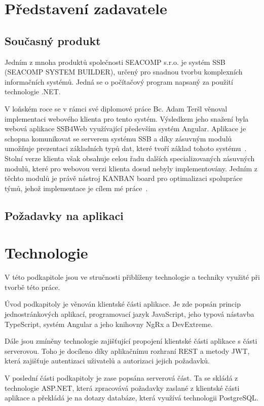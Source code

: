 \section{Představení zadavatele}
\blindtext

\subsection{Současný produkt}
Jedním z mnoha produktů společnosti SEACOMP s.r.o. je systém SSB (SEACOMP SYSTEM BUILDER), určený pro snadnou tvorbu komplexních informačních systémů. Jedná se o počítačový program napsaný za použití technologie .NET.

V loňském roce se v rámci své diplomové práce Bc. Adam Teršl věnoval implementaci webového klienta pro tento systém. Výsledkem jeho snažení byla webová aplikace SSB4Web využívající především systém Angular. Aplikace je schopna komunikovat se serverem systému SSB a díky zásuvným modulů umožňuje prezentaci základních typů dat, které tvoří základ tohoto systému~\cite{bib:tersl}. Stolní verze klienta však obsahuje celou řadu dalších specializovaných zásuvných modulů, které pro webovou verzi klienta dosud nebyly implementovány. Jedním z těchto modulů je právě nástroj KANBAN board pro optimalizaci spolupráce týmů, jehož implementace je cílem mé práce~\cite{bib:seacomp-portfolio}. 

\subsection{Požadavky na aplikaci}
\blindtext[3]

\section{Technologie}
V této podkapitole jsou ve stručnosti přiblíženy technologie a techniky využité při tvorbě této práce. 

Úvod podkapitoly je věnován klientské části aplikace. Je zde popsán princip jednostránkových aplikací, programovací jazyk JavaScript, jeho typová nástavba TypeScript, systém Angular a jeho knihovny NgRx a DevExtreme.

Dále jsou zmíněny technologie zajišťující propojení klientské části aplikace s části serverovou. Toho je docíleno díky aplikačnímu rozhraní REST a metody JWT, která zajišťuje autentizaci uživatelů a autorizaci jejich požadavků.

V poslední části podkapitoly je zase popsána serverová část. Ta se skládá z technologie ASP.NET, která zpracovává požadavky zaslané z klientské části aplikace a překládá je na dotazy databáze, která využívá technologii PostgreSQL.


